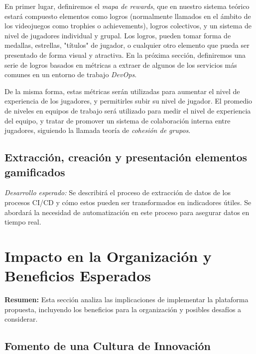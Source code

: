 \documentclass[journal]{IEEEtran}
\begin{document}
En primer lugar, definiremos el \textit{mapa de rewards}, que en nuestro sistema teórico estará compuesto elementos como logros (normalmente llamados en el ámbito de los videojuegos como trophies o achievements), logros colectivos, y un sistema de nivel de jugadores individual y grupal. Los logros, pueden tomar forma de medallas, estrellas, "títulos" de jugador, o cualquier otro elemento que pueda ser presentado de forma visual y atractiva. En la próxima sección, definiremos una serie de logros basados en métricas a extraer de algunos de los servicios más comunes en un entorno de trabajo \textit{DevOps}.

De la misma forma, estas métricas serán utilizadas para aumentar el nivel de experiencia de los jugadores, y permitirles subir su nivel de jugador. El promedio de niveles en equipos de trabajo será utilizado para medir el nivel de experiencia del equipo, y tratar de promover un sistema de colaboración interna entre jugadores, siguiendo la llamada teoría de \textit{cohesión de grupos}\cite{mueller2024leveraging}.

\subsection{\textbf{Extracción, creación y presentación elementos gamificados}}

\textit{Desarrollo esperado:} Se describirá el proceso de extracción de datos de los procesos CI/CD y cómo estos pueden ser transformados en indicadores útiles. Se abordará la necesidad de automatización en este proceso para asegurar datos en tiempo real.

\section{\textbf{\Large Impacto en la Organización y Beneficios Esperados}}

\textbf{Resumen:} Esta sección analiza las implicaciones de implementar la plataforma propuesta, incluyendo los beneficios para la organización y posibles desafíos a considerar.

\subsection{\textbf{Fomento de una Cultura de Innovación}}
\end{document}

